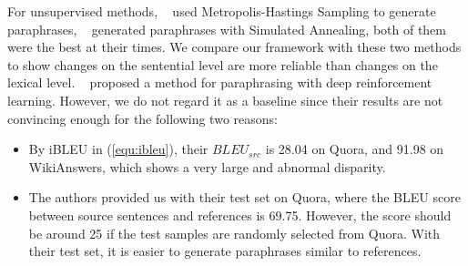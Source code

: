 For unsupervised methods, %
\citeauthor{miao2019cgmh}~ used Metropolis-Hastings Sampling to generate paraphrases, \citeauthor{liu2019unsupervised}~ generated paraphrases with Simulated Annealing, both of them were the best at their times. 
We compare our framework with these two methods to show changes on the sentential level are more reliable than changes on the lexical level.
\citeauthor{pup2020}~ proposed a method for paraphrasing with deep reinforcement learning. However, we do not regard it as a baseline since their results are not convincing enough for the following two reasons:
\begin{itemize}
\item By iBLEU in (\ref{equ:ibleu}), their $BLEU_{src}$ is 28.04 on Quora, and 
91.98 on WikiAnswers, which shows a very large and abnormal disparity.
\item The authors provided us with their test set on Quora, where the BLEU score between source sentences and references is 69.75. However, the score should be around 25 if the test samples are randomly selected from Quora. With their test set, it is easier to generate paraphrases similar to references. 
\end{itemize}



